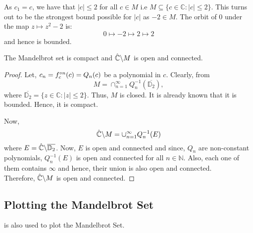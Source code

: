 As \( c_1=c \), we have that \( |c|\le 2 \) for all \( c\in M \) i.e \( M \subseteq \{c\in \mathbb{C}:|c|\le 2\} \). 
This turns out to be the strongest bound possible for \( |c| \)
as \( -2\in M \). The orbit of \( 0 \) under the map \( z\mapsto z^2-2 \) is: \[ 0\mapsto -2\mapsto 2\mapsto 2 \]
and hence is bounded.

\begin{theorem}
	The Mandelbrot set is compact and \( \hat{\mathbb{C}}\backslash M \) is open and connected.
\end{theorem}
\begin{proof}
	Let, \( c_n=\fcof[n](c)=Q_n(c) \) be a polynomial in \( c \). Clearly, from  \[
		M=\cap_{n=1}^{\infty}Q_n^{-1}(\overline{\mathbb{D}_2}),
	\] where \( \overline{\mathbb{D}_2}=\{z\in \mathbb{C}:|z|\le 2\} \).
	Thus, \( M \) is closed. It is already known that it is bounded. Hence, it is compact.

	Now, \[
		\hat{\mathbb{C}}\backslash M=\cup_{n=1}^\infty Q_n^{-1}(E)
	\] where \( E=\hat{\mathbb{C}}\backslash\overline{\mathbb{D}_2}\). Now, \( E \) is open and connected and 
	since, \( Q_n \) are non-constant polynomials, \( Q_n^{-1}(E) \) is open and connected for all \( n\in \mathbb{N} \).
	Also, each one of them contains \( \infty \) and hence, their union is also open and connected.\\
	Therefore, \( \hat{\mathbb{C}}\backslash M \) is open and connected.

\end{proof}

\subsection{Plotting the Mandelbrot Set}
 is also used to plot the Mandelbrot Set.
